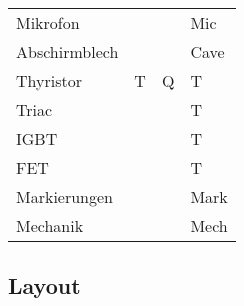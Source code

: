 \begin{table}[h!]
\begin{tabular}{llll}
  \rowcolor{white}  Mikrofon                &       &       & Mic \\
  \rowcolor{lgray}  Abschirmblech           &       &       & Cave \\
  \rowcolor{white}  Thyristor               & T     & Q     & T \\
  \rowcolor{lgray}  Triac                   &       &       & T \\
  \rowcolor{white}  IGBT                    &       &       & T \\
  \rowcolor{lgray}  FET                     &       &       & T \\
  \rowcolor{white}  Markierungen            &       &       & Mark \\
  \rowcolor{lgray}  Mechanik                &       &       & Mech
  \end{tabular}
\end{table}

\subsection{Layout}